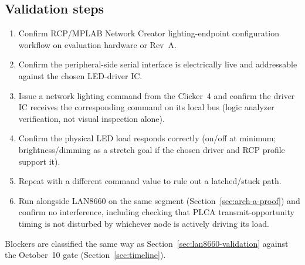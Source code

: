 \subsection{Validation steps}

\begin{enumerate}[itemsep=0.1em]
\item Confirm RCP/MPLAB Network Creator lighting-endpoint configuration workflow on evaluation hardware or Rev~A.
\item Confirm the peripheral-side serial interface is electrically live and addressable against the chosen LED-driver IC.
\item Issue a network lighting command from the Clicker~4 and confirm the driver IC receives the corresponding command on its local bus (logic analyzer verification, not visual inspection alone).
\item Confirm the physical LED load responds correctly (on/off at minimum; brightness/dimming as a stretch goal if the chosen driver and RCP profile support it).
\item Repeat with a different command value to rule out a latched/stuck path.
\item Run alongside LAN8660 on the same segment (Section~\ref{sec:arch-a-proof}) and confirm no interference, including checking that PLCA transmit-opportunity timing is not disturbed by whichever node is actively driving its load.
\end{enumerate}

Blockers are classified the same way as Section~\ref{sec:lan8660-validation} against the October~10 gate (Section~\ref{sec:timeline}).
